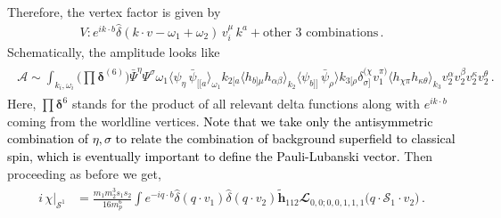 Therefore, the vertex factor is given by
\begin{align}
    V: e^{ik\cdot b}\hat\delta(k\cdot v-\omega_1+\omega_2)\,v_i^\mu \,k^a+\textrm{other 3 combinations}\,.
\end{align}
Schematically, the amplitude looks like
\begin{align}
    \begin{split}
       \mathcal{A}\sim\int_{k_i,\omega_i}\Big(\prod\boldsymbol{\delta}^{(6)}\Big)\bar\Psi^\eta\Psi^\sigma\omega_1\langle \psi_\eta\,\bar\psi_{[[a}\rangle_{\omega_1}k_{2[a}\langle  h_{b]\mu}h_{\alpha\beta}\rangle_{k_2} \langle \psi_{b]]}\,\bar\psi_\rho\rangle k_{3[\rho}\delta^{(\chi}_{\sigma]}v_1^{\pi)} \langle  h_{\chi\pi}h_{\kappa\theta}\rangle_{k_3}v_2^\alpha v_2^\beta v_2^\kappa v_2^\theta\,.\nonumber
    \end{split}
\end{align}
Here, $\prod \boldsymbol\delta^6$ stands for the product of all relevant delta functions along with $e^{ik\cdot b}$ coming from the worldline vertices. \textcolor{black}{Note that we take only the antisymmetric combination of $\eta,\sigma$ to relate the combination of background superfield to classical spin, which is eventually important to define the Pauli-Lubanski vector.} 
Then proceeding as before we get, 
\begin{align}
    \begin{split}
i\,\chi\Big|_{\mathcal{S}^1}&=\frac{ m_1 m_2^3 s_1 s_2}{16 m_p^6}\int e^{-iq\cdot b} \hat\delta(q\cdot v_1)\hat\delta(q\cdot v_2)\boldsymbol{\tilde h}_{112} \mathbfcal{L}_{0,0;0,0,1,1,1}\big(q\cdot\mathcal{S}_1\cdot v_2\big)\,.
       \end{split}
\end{align}
